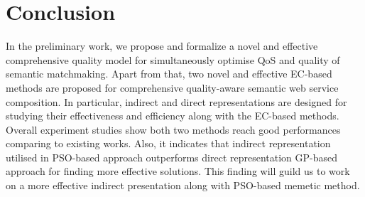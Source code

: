 \section{Conclusion}\label{summary2}
In the preliminary work, we propose and formalize a novel and effective comprehensive quality model for simultaneously optimise QoS and quality of semantic matchmaking. Apart from that, two novel and effective EC-based methods are proposed for comprehensive quality-aware semantic web service composition. In particular, indirect and direct representations are designed for studying their effectiveness and efficiency along with the EC-based methods. Overall experiment studies show both two methods reach good performances comparing to existing works. Also, it indicates that indirect representation utilised in PSO-based approach outperforms direct representation GP-based approach for finding more effective solutions. This finding will guild us to work on a more effective indirect presentation along with PSO-based memetic method.
